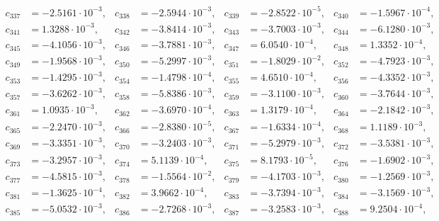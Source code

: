 \begin{align*}
c_{ 337 } &= -2.5161 \cdot 10^{ -3 }, & c_{ 338 } &= -2.5944 \cdot 10^{ -3 }, & c_{ 339 } &= -2.8522 \cdot 10^{ -5 }, & c_{ 340 } &= -1.5967 \cdot 10^{ -4 },\\ 
c_{ 341 } &= 1.3288 \cdot 10^{ -3 }, & c_{ 342 } &= -3.8414 \cdot 10^{ -3 }, & c_{ 343 } &= -3.7003 \cdot 10^{ -3 }, & c_{ 344 } &= -6.1280 \cdot 10^{ -3 },\\ 
c_{ 345 } &= -4.1056 \cdot 10^{ -3 }, & c_{ 346 } &= -3.7881 \cdot 10^{ -3 }, & c_{ 347 } &= 6.0540 \cdot 10^{ -4 }, & c_{ 348 } &= 1.3352 \cdot 10^{ -4 },\\ 
c_{ 349 } &= -1.9568 \cdot 10^{ -3 }, & c_{ 350 } &= -5.2997 \cdot 10^{ -3 }, & c_{ 351 } &= -1.8029 \cdot 10^{ -2 }, & c_{ 352 } &= -4.7923 \cdot 10^{ -3 },\\ 
c_{ 353 } &= -1.4295 \cdot 10^{ -3 }, & c_{ 354 } &= -1.4798 \cdot 10^{ -4 }, & c_{ 355 } &= 4.6510 \cdot 10^{ -4 }, & c_{ 356 } &= -4.3352 \cdot 10^{ -3 },\\ 
c_{ 357 } &= -3.6262 \cdot 10^{ -3 }, & c_{ 358 } &= -5.8386 \cdot 10^{ -3 }, & c_{ 359 } &= -3.1100 \cdot 10^{ -3 }, & c_{ 360 } &= -3.7644 \cdot 10^{ -3 },\\ 
c_{ 361 } &= 1.0935 \cdot 10^{ -3 }, & c_{ 362 } &= -3.6970 \cdot 10^{ -4 }, & c_{ 363 } &= 1.3179 \cdot 10^{ -4 }, & c_{ 364 } &= -2.1842 \cdot 10^{ -3 },\\ 
c_{ 365 } &= -2.2470 \cdot 10^{ -3 }, & c_{ 366 } &= -2.8380 \cdot 10^{ -5 }, & c_{ 367 } &= -1.6334 \cdot 10^{ -4 }, & c_{ 368 } &= 1.1189 \cdot 10^{ -3 },\\ 
c_{ 369 } &= -3.3351 \cdot 10^{ -3 }, & c_{ 370 } &= -3.2403 \cdot 10^{ -3 }, & c_{ 371 } &= -5.2979 \cdot 10^{ -3 }, & c_{ 372 } &= -3.5381 \cdot 10^{ -3 },\\ 
c_{ 373 } &= -3.2957 \cdot 10^{ -3 }, & c_{ 374 } &= 5.1139 \cdot 10^{ -4 }, & c_{ 375 } &= 8.1793 \cdot 10^{ -5 }, & c_{ 376 } &= -1.6902 \cdot 10^{ -3 },\\ 
c_{ 377 } &= -4.5815 \cdot 10^{ -3 }, & c_{ 378 } &= -1.5564 \cdot 10^{ -2 }, & c_{ 379 } &= -4.1703 \cdot 10^{ -3 }, & c_{ 380 } &= -1.2569 \cdot 10^{ -3 },\\ 
c_{ 381 } &= -1.3625 \cdot 10^{ -4 }, & c_{ 382 } &= 3.9662 \cdot 10^{ -4 }, & c_{ 383 } &= -3.7394 \cdot 10^{ -3 }, & c_{ 384 } &= -3.1569 \cdot 10^{ -3 },\\ 
c_{ 385 } &= -5.0532 \cdot 10^{ -3 }, & c_{ 386 } &= -2.7268 \cdot 10^{ -3 }, & c_{ 387 } &= -3.2583 \cdot 10^{ -3 }, & c_{ 388 } &= 9.2504 \cdot 10^{ -4 },\\ 

\end{align*}
